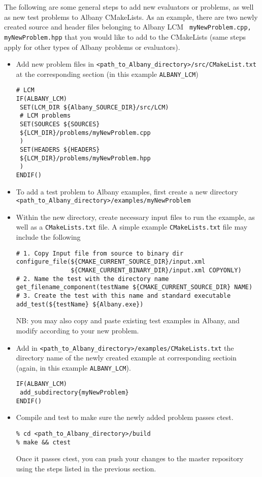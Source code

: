 \documentclass[pdf,12pt,report,strict]{SANDreport}
\theoremstyle{remark}
\begin{document}
The following are some general steps to add new evaluators or problems, as well as new test problems to Albany CMakeLists. As an example, there are two newly created source and header files belonging to Albany LCM \verb+ myNewProblem.cpp, myNewProblem.hpp+ that you would like to add to the CMakeLists (same steps apply for other types of Albany problems or evaluators). 
\begin{itemize}
\item Add new problem files in \verb+<path_to_Albany_directory>/src/CMakeList.txt+ at the corresponding section (in this example \verb+ALBANY_LCM+)
\begin{verbatim}
# LCM
IF(ALBANY_LCM)
 SET(LCM_DIR ${Albany_SOURCE_DIR}/src/LCM)
 # LCM problems
 SET(SOURCES ${SOURCES}
 ${LCM_DIR}/problems/myNewProblem.cpp
 )
 SET(HEADERS ${HEADERS}
 ${LCM_DIR}/problems/myNewProblem.hpp
 )
ENDIF()
\end{verbatim}

\item To add a test problem to Albany examples, first create a new directory \verb+<path_to_Albany_directory>/examples/myNewProblem+

\item Within the new directory, create necessary input files to run the example, as well as a \verb+CMakeLists.txt+ file. A simple example \verb+CMakeLists.txt+ file may include the following 
\begin{verbatim}
# 1. Copy Input file from source to binary dir
configure_file(${CMAKE_CURRENT_SOURCE_DIR}/input.xml
               ${CMAKE_CURRENT_BINARY_DIR}/input.xml COPYONLY)
# 2. Name the test with the directory name
get_filename_component(testName ${CMAKE_CURRENT_SOURCE_DIR} NAME)
# 3. Create the test with this name and standard executable
add_test(${testName} ${Albany.exe})
\end{verbatim}
NB: you may also copy and paste existing test examples in Albany, and modify according to your new problem. 

\item Add in \verb+<path_to_Albany_directory>/examples/CMakeLists.txt+ the directory name of the newly created example at corresponding sectioin (again, in this example \verb+ALBANY_LCM+). 
\begin{verbatim}
IF(ALBANY_LCM)
 add_subdirectory{myNewProblem}  
ENDIF()
\end{verbatim}

\item Compile and test to make sure the newly added problem passes ctest. 
\begin{verbatim}
% cd <path_to_Albany_directory>/build
% make && ctest
\end{verbatim}
Once it passes ctest, you can push your changes to the master repository using the steps listed in the previous section.
\end{itemize}
\end{document}
